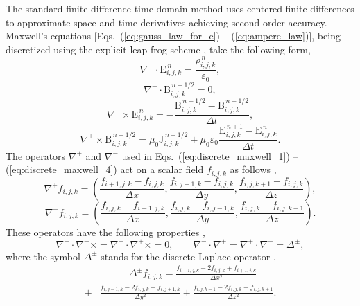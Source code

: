 \documentclass[10pt, a4paper, twoside, openright]{report}
\renewcommand{\vec}[1]{\boldsymbol{\mathrm{#1}}}
\begin{document}
The standard finite-difference time-domain method uses centered finite differences to approximate space and time derivatives achieving second-order accuracy. Maxwell's equations [Eqs.~(\ref{eq:gauss_law_for_e}) -- (\ref{eq:ampere_law})], being discretized using the explicit leap-frog scheme \cite{Press2007}, take the following form,
\begin{equation}\label{eq:discrete_maxwell_1}
	\nabla^{+} \cdot \vec{E}_{i, j, k}^{\,n} = \frac{\rho_{i, j, k}^{\,n}}{\varepsilon_0},
\end{equation}
\begin{equation}\label{eq:discrete_maxwell_2}
	\nabla^{-} \cdot \vec{B}_{i, j, k}^{\,n + 1/2} = 0,
\end{equation}
\begin{equation}\label{eq:discrete_maxwell_3}
	\nabla^{-} \times \vec{E}_{i, j, k}^{\,n} = -\frac{\vec{B}_{i, j, k}^{\,n + 1/2} - \vec{B}_{i, j, k}^{\,n - 1/2}}{\Delta t},
\end{equation}
\begin{equation}\label{eq:discrete_maxwell_4}
	\nabla^{+} \times \vec{B}_{i, j, k}^{\,n + 1/2} = \mu_{0} \vec{J}_{i, j, k}^{\,n + 1/2} + \mu_0 \varepsilon_0 \frac{\vec{E}_{i, j, k}^{\,n + 1} - \vec{E}_{i, j, k}^{\,n}}{\Delta t}.
\end{equation}
The operators $ \nabla^{+} $ and $ \nabla^{-} $ used in Eqs.~(\ref{eq:discrete_maxwell_1}) -- (\ref{eq:discrete_maxwell_4}) act on a scalar field $ f_{i, j, k} $ as follows \cite{Esirkepov2001},
\begin{equation}\label{eq:nabla_plus}
	\nabla^{+} f_{i, j, k} = \left( \frac{f_{i + 1, j, k} - f_{i, j, k}}{\Delta x}, \frac{f_{i, j + 1, k} - f_{i, j, k}}{\Delta y}, \frac{f_{i, j, k + 1} - f_{i, j, k}}{\Delta z} \right), 
\end{equation}
\begin{equation}\label{eq:nabla_minus}
	\nabla^{-} f_{i, j, k} = \left( \frac{f_{i, j, k} - f_{i - 1, j, k}}{\Delta x}, \frac{f_{i, j, k} - f_{i, j - 1, k}}{\Delta y}, \frac{f_{i, j, k} - f_{i, j, k - 1}}{\Delta z} \right).
\end{equation}
These operators have the following properties \cite{Esirkepov2001},
\begin{equation}\label{eq:nabla_properties}
	\nabla^{-} \cdot \nabla^{-} \times = \nabla^{+} \cdot \nabla^{+} \times = 0, \qquad \nabla^{-} \cdot \nabla^{+} = \nabla^{+} \cdot \nabla^{-} = \Delta^{\pm},
\end{equation}
where the symbol $ \Delta^{\pm} $ stands for the discrete Laplace operator \cite{Esirkepov2001},
\begin{equation}\label{eq:discrete_laplace}
	\begin{aligned}
	& \quad \quad \quad \Delta^{\pm} f_{i, j, k} = \frac{f_{i - 1, j, k} - 2 f_{i, j, k} + f_{i + 1, j, k}}{\Delta x^{2}} \\[3mm]
	+ & \frac{f_{i, j - 1, k} - 2 f_{i, j, k} + f_{i, j + 1, k}}{\Delta y^{2}} + \frac{f_{i, j, k - 1} - 2 f_{i, j, k} + f_{i, j, k + 1}}{\Delta z^{2}}.
	\end{aligned}
\end{equation}
\end{document}
